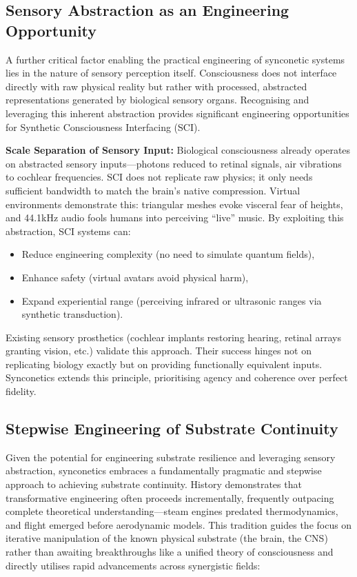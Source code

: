 \documentclass[10pt]{article}
\begin{document}
\begin{sloppypar}
  \subsection{Sensory Abstraction as an Engineering Opportunity}

  A further critical factor enabling the practical engineering of synconetic systems lies in the nature of sensory perception itself. Consciousness does not interface directly with raw physical reality but rather with processed, abstracted representations generated by biological sensory organs. Recognising and leveraging this inherent abstraction provides significant engineering opportunities for Synthetic Consciousness Interfacing (SCI).

  \textbf{Scale Separation of Sensory Input:} Biological consciousness already operates on abstracted sensory inputs—photons reduced to retinal signals, air vibrations to cochlear frequencies. SCI does not replicate raw physics; it only needs sufficient bandwidth to match the brain’s native compression. Virtual environments demonstrate this: triangular meshes evoke visceral fear of heights, and 44.1kHz audio fools humans into perceiving “live” music. By exploiting this abstraction, SCI systems can:

  \begin{itemize}
    \item Reduce engineering complexity (no need to simulate quantum fields),
    \item Enhance safety (virtual avatars avoid physical harm),
    \item Expand experiential range (perceiving infrared or ultrasonic ranges via synthetic transduction).
  \end{itemize}

  Existing sensory prosthetics (cochlear implants restoring hearing, retinal arrays granting vision, etc.) validate this approach. Their success hinges not on replicating biology exactly but on providing functionally equivalent inputs. Synconetics extends this principle, prioritising agency and coherence over perfect fidelity.

  \subsection{Stepwise Engineering of Substrate Continuity}
  \label{sec:pragmatic-path-forward}

  Given the potential for engineering substrate resilience and leveraging sensory abstraction, synconetics embraces a fundamentally pragmatic and stepwise approach to achieving substrate continuity. History demonstrates that transformative engineering often proceeds incrementally, frequently outpacing complete theoretical understanding—steam engines predated thermodynamics, and flight emerged before aerodynamic models. This tradition guides the focus on iterative manipulation of the known physical substrate (the brain, the CNS) rather than awaiting breakthroughs like a unified theory of consciousness and directly utilises rapid advancements across synergistic fields:


\end{sloppypar}
\end{document}
